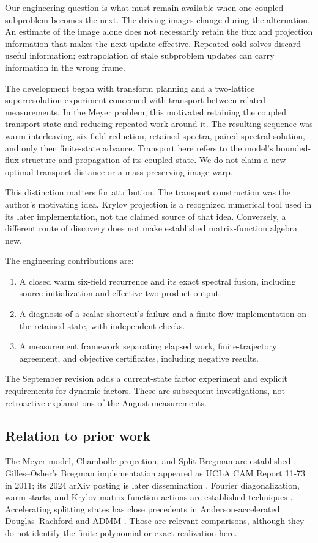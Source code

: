 \documentclass[10pt,twocolumn]{article}
\theoremstyle{definition}\newtheorem{remark}[proposition]{Remark}
\begin{document}
Our engineering question is what must remain available when one coupled
subproblem becomes the next. The driving images change during the
alternation. An estimate of the image alone does not necessarily retain
the flux and projection information that makes the next update effective.
Repeated cold solves discard useful information; extrapolation of stale
subproblem updates can carry information in the wrong frame.

The development began with transform planning and a two-lattice
superresolution experiment concerned with transport between related
measurements. In the Meyer problem, this motivated retaining the coupled
transport state and reducing repeated work around it. The resulting
sequence was warm interleaving, six-field reduction, retained spectra,
paired spectral solution, and only then finite-state advance.
Transport here refers to the model's bounded-flux structure and propagation
of its coupled state. We do not claim a new optimal-transport distance or
a mass-preserving image warp.

This distinction matters for attribution. The transport construction was
the author's motivating idea. Krylov projection is a recognized numerical
tool used in its later implementation, not the claimed source of that
idea. Conversely, a different route of discovery does not make established
matrix-function algebra new.

The engineering contributions are:
\begin{enumerate}
\item A closed warm six-field recurrence and its exact spectral fusion,
including source initialization and effective two-product output.
\item A diagnosis of a scalar shortcut's failure and a finite-flow
implementation on the retained state, with independent checks.
\item A measurement framework separating elapsed work, finite-trajectory
agreement, and objective certificates, including negative results.
\end{enumerate}
The September revision adds a current-state factor experiment and explicit
requirements for dynamic factors. These are subsequent investigations, not
retroactive explanations of the August measurements.

\subsection{Relation to prior work}
The Meyer model, Chambolle projection, and Split Bregman are established
\cite{meyer2001,aujol2005,chambolle2004,goldstein2009}.
Gilles--Osher's Bregman implementation appeared as UCLA CAM Report 11-73
in 2011; its 2024 arXiv posting is later dissemination \cite{gilles2024}.
Fourier diagonalization, warm starts, and Krylov matrix-function actions
are established techniques \cite{saad1992,jia2015}. Accelerating splitting
states has close precedents in Anderson-accelerated Douglas--Rachford and
ADMM \cite{fu2020,ouyang2020}. Those are relevant comparisons, although
they do not identify the finite polynomial or exact realization here.
\end{document}
